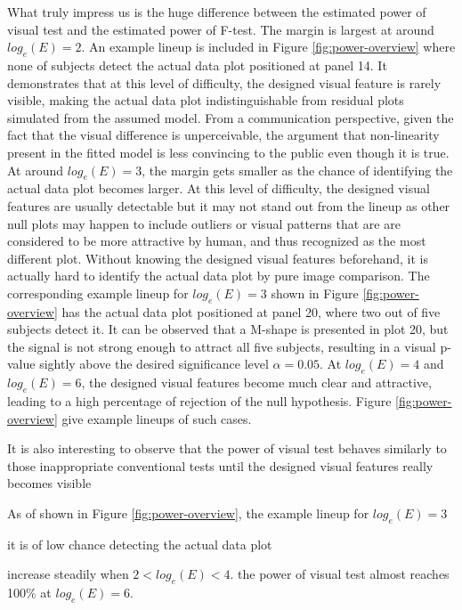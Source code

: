 \documentclass[]{interact}
\theoremstyle{plain}%
\theoremstyle{definition}
\theoremstyle{remark}
\begin{document}
What truly impress us is the huge difference between the estimated power
of visual test and the estimated power of F-test. The margin is largest
at around \(log_e(E) = 2\). An example lineup is included in Figure
\ref{fig:power-overview} where none of subjects detect the actual data
plot positioned at panel 14. It demonstrates that at this level of
difficulty, the designed visual feature is rarely visible, making the
actual data plot indistinguishable from residual plots simulated from
the assumed model. From a communication perspective, given the fact that
the visual difference is unperceivable, the argument that non-linearity
present in the fitted model is less convincing to the public even though
it is true. At around \(log_e(E) = 3\), the margin gets smaller as the
chance of identifying the actual data plot becomes larger. At this level
of difficulty, the designed visual features are usually detectable but
it may not stand out from the lineup as other null plots may happen to
include outliers or visual patterns that are are considered to be more
attractive by human, and thus recognized as the most different plot.
Without knowing the designed visual features beforehand, it is actually
hard to identify the actual data plot by pure image comparison. The
corresponding example lineup for \(log_e(E) = 3\) shown in Figure
\ref{fig:power-overview} has the actual data plot positioned at panel
20, where two out of five subjects detect it. It can be observed that a
M-shape is presented in plot 20, but the signal is not strong enough to
attract all five subjects, resulting in a visual p-value sightly above
the desired significance level \(\alpha = 0.05\). At \(log_e(E) = 4\)
and \(log_e(E) = 6\), the designed visual features become much clear and
attractive, leading to a high percentage of rejection of the null
hypothesis. Figure \ref{fig:power-overview} give example lineups of such
cases.

It is also interesting to observe that the power of visual test behaves
similarly to those inappropriate conventional tests until the designed
visual features really becomes visible

As of shown in Figure \ref{fig:power-overview}, the example lineup for
\(log_e(E) = 3\)

it is of low chance detecting the actual data plot

increase steadily when \(2<log_e(E)<4\). the power of visual test almost
reaches 100\% at \(log_e(E) = 6\).
\end{document}
